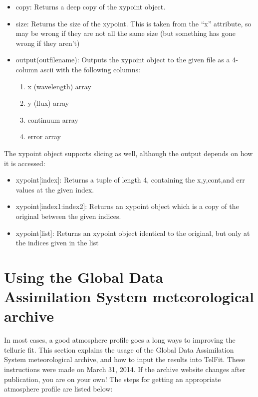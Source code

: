 \documentclass{article}
\begin{document}
\begin{itemize}
\begin{itemize}
  \item copy: Returns a deep copy of the xypoint object.
  \item size: Returns the size of the xypoint. This is taken from the ``x'' attribute, so may be wrong if they are not all the same size (but something has gone wrong if they aren't)
  \item output(outfilename): Outputs the xypoint object to the given file as a 4-column ascii with the following columns:
  \begin{enumerate}
    \item x (wavelength) array
    \item y (flux) array
    \item continuum array
    \item error array
  \end{enumerate}
  
  
\end{itemize}
  
The xypoint object supports slicing as well, although the output depends on how it is accessed:
\begin{itemize}

  \item xypoint[index]: Returns a tuple of length 4, containing the x,y,cont,and err values at the given index.
  \item xypoint[index1:index2]: Returns an xypoint object which is a copy of the original between the given indices. 
  \item xypoint[list]: Returns an xypoint object identical to the original, but only at the indices given in the list

\end{itemize}




\end{itemize}



\appendix
\section{Using the Global Data Assimilation System meteorological archive}

\label{ap:gdas}

In most cases, a good atmosphere profile goes a long ways to improving the telluric fit. This section explains the usage of the Global Data Assimilation System meteorological archive, and how to input the results into TelFit. These instructions were made on March 31, 2014. If the archive website changes after publication, you are on your own! The steps for getting an appropriate atmosphere profile are listed below:
\end{document}
